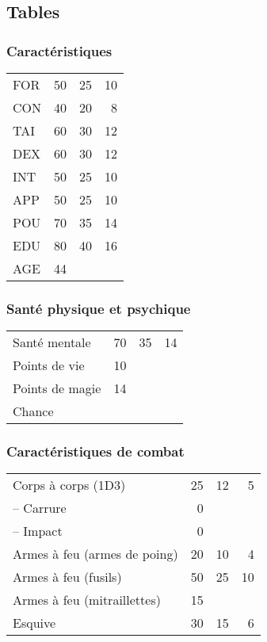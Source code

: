 \documentclass[11pt]{article}
\begin{document}
\begin{twocols}

\subsection{Tables}
\label{sec:orgc31cfc9}
\subsubsection{Caractéristiques}
\label{sec:orgcc6ad4e}

\begin{center}
\begin{tabular}{lrrr}
FOR & 50 & 25 & 10\\
CON & 40 & 20 & 8\\
TAI & 60 & 30 & 12\\
DEX & 60 & 30 & 12\\
INT & 50 & 25 & 10\\
APP & 50 & 25 & 10\\
POU & 70 & 35 & 14\\
EDU & 80 & 40 & 16\\
AGE & 44 &  & \\
\end{tabular}
\end{center}

\subsubsection{Santé physique et psychique}
\label{sec:org26874fc}

\begin{center}
\begin{tabular}{lrrr}
Santé mentale & 70 & 35 & 14\\
Points de vie & 10 &  & \\
Points de magie & 14 &  & \\
Chance &  &  & \\
\end{tabular}
\end{center}

\subsubsection{Caractéristiques de combat}
\label{sec:orgc00b49f}


\begin{center}
\begin{tabular}{lrrr}
Corps à corps (1D3) & 25 & 12 & 5\\
-- Carrure & 0 &  & \\
-- Impact & 0 &  & \\
Armes à feu (armes de poing) & 20 & 10 & 4\\
Armes à feu (fusils) & 50 & 25 & 10\\
Armes à feu (mitraillettes) & 15 &  & \\
Esquive & 30 & 15 & 6\\
\end{tabular}
\end{center}


\end{twocols}
\end{document}
